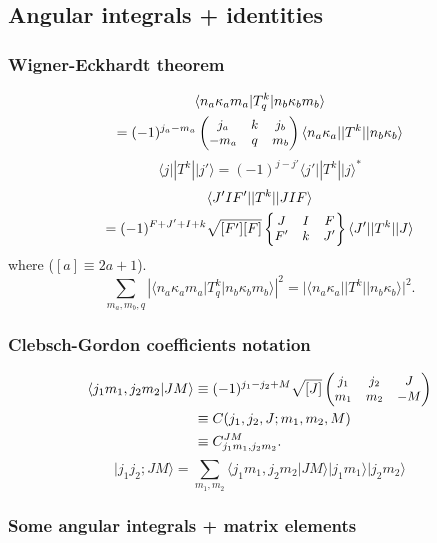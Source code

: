 \documentclass[10pt,twocolumn,a4paper]{article}%
\newcommand{\bra}[1]{\ensuremath{\langle #1|}}	%
\newcommand{\ket}[1]{\ensuremath{|#1\rangle}}	%
\newcommand{\braket}[1]{\ensuremath{\langle #1\rangle}}	%
\newcommand{\threej}[6]{\small\ensuremath{\begin{pmatrix}#1&#2&#3\\#4&#5&#6\end{pmatrix}}}	%
\newcommand{\sixj}[6]{\small\ensuremath{\begin{Bmatrix}#1&#2&#3\\#4&#5&#6\end{Bmatrix}}}	%
\newcommand{\be}{\begin{equation}}
\newcommand{\ee}{\end{equation}}
\renewcommand{\k}{\ensuremath{\kappa}}
\begin{document}
\subsection{Angular integrals + identities}


\subsubsection*{Wigner-Eckhardt theorem}
\begin{multline}
\bra{n_a \k_a m_a}T^k_q\ket{n_b \k_b m_b} \\= (-1)^{j_a-m_a}\threej{j_a}{k}{j_b}{-m_a}{q}{m_b} \bra{n_a \k_a}|T^k|\ket{n_b \k_b}
\end{multline}
\be
\bra{j}|T^k|\ket{j'} = (-1)^{j-j'}\bra{j'}|T^k|\ket{j}^*
\ee
%
\begin{multline}
\bra{J'IF'}|T^k|\ket{JIF} \\= (-1)^{F+J'+I+k}\sqrt{[F'][F]}\sixj{J}{I}{F}{F'}{k}{J'}\bra{J'}|T^k|\ket{J}
\end{multline}
where ($[a]\equiv2a+1$).
%
\be
\sum_{m_a,m_b,q} |\bra{n_a \k_a m_a}T^k_q\ket{n_b \k_b m_b}|^2 = |\bra{n_a \k_a}|T^k|\ket{n_b \k_b}|^2.
\ee







\subsubsection*{Clebsch-Gordon coefficients notation}

\begin{align}
\braket{j_1 m_1,j_2m_2|JM} &\equiv (-1)^{j_1-j_2+M}\sqrt{[J]}\threej{j_1}{j_2}{J}{m_1}{m_2}{-M}\\
&\equiv C(j_1,j_2,J; m_1, m_2, M)\\
&\equiv C^{JM}_{j_1m_1,j_2m_2}.
\end{align}
\be
\ket{j_1 j_2;JM} =\sum_{m_1,m_2} \braket{j_1 m_1,j_2m_2|JM} \ket{j_1m_1}\ket{j_2m_2}
\ee






\subsubsection*{Some angular integrals + matrix elements}
\end{document}
